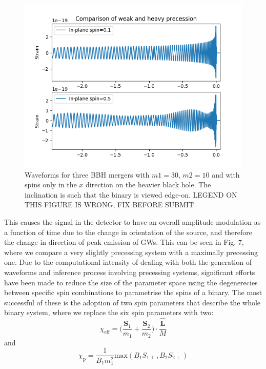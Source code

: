 \documentclass[11pt]{article}
\begin{document}
\begin{figure}[H]
	\includegraphics[scale=0.8]{fig7.png}
	\centering
	\caption{Waveforms for three BBH mergers with $m1=30$, $m2=10$ and with spins only in the $x$ direction on the heavier black hole. The inclination is such that the binary is viewed edge-on. LEGEND ON THIS FIGURE IS WRONG, FIX BEFORE SUBMIT}
	\centering
\end{figure}
This causes the signal in the detector to have an overall amplitude modulation as a function of time due to the change in orientation of the source, and therefore the change in direction of peak emission of GWs. This can be seen in Fig. 7, where we compare a very slightly precessing system with a maximally precessing one.
Due to the computational intensity of dealing with both the generation of waveforms and inference process involving precessing systems, significant efforts have been made to reduce the size of the parameter space using the degenerecies between specific spin combinations to parametrise the spins of a binary. The most successful of these is the adoption of two spin parameters\cite{imr}\cite{chip} that describe the whole binary system, where we replace the six spin parameters with two:
\begin{equation}
\chi_{\text{eff}}=\bigg(\frac{\mathbf{S}_1}{m_1}+\frac{\mathbf{S}_2}{m_2}\bigg)\cdot\frac{\mathbf{\hat{L}}}{M}
\end{equation}
and
\begin{equation}
\chi_\text{p}=\frac{1}{B_1m^2_1}\text{max}(B_1S_{1\perp},B_2S_{2\perp})
\end{equation}
\end{document}
